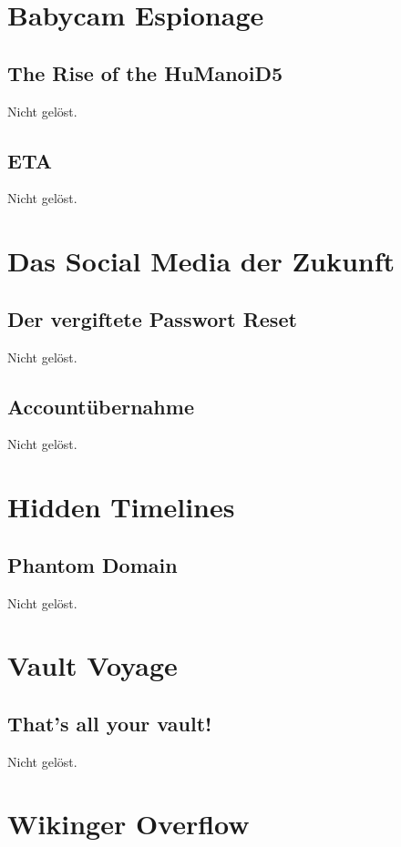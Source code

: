 \documentclass[12pt,a4paper,titlepage,oneside]{scrartcl}
\begin{document}
\section{Babycam Espionage}

\subsection{The Rise of the HuManoiD5}
Nicht gelöst.

\subsection{ETA}
Nicht gelöst.


\section{Das Social Media der Zukunft}

\subsection{Der vergiftete Passwort Reset}
Nicht gelöst.

\subsection{Accountübernahme}
Nicht gelöst.


\section{Hidden Timelines}

\subsection{Phantom Domain}
Nicht gelöst.


\section{Vault Voyage}

\subsection{That's all your vault!}
Nicht gelöst.


\section{Wikinger Overflow}
\end{document}
